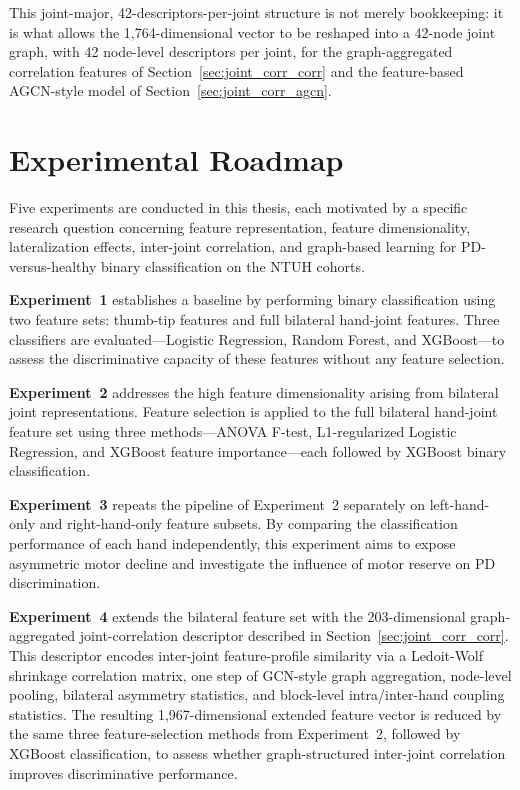 This joint-major, 42-descriptors-per-joint structure is not merely bookkeeping: it is what allows the 1,764-dimensional vector to be reshaped into a 42-node joint graph, with 42 node-level descriptors per joint, for the graph-aggregated correlation features of Section~\ref{sec:joint_corr_corr} and the feature-based AGCN-style model of Section~\ref{sec:joint_corr_agcn}.

\section{Experimental Roadmap}
\label{sec:roadmap}

Five experiments are conducted in this thesis, each motivated by a specific research question concerning feature representation, feature dimensionality, lateralization effects, inter-joint correlation, and graph-based learning for PD-versus-healthy binary classification on the NTUH cohorts.

\textbf{Experiment~1} establishes a baseline by performing binary classification using two feature sets: thumb-tip features and full bilateral hand-joint features. Three classifiers are evaluated---Logistic Regression, Random Forest, and XGBoost---to assess the discriminative capacity of these features without any feature selection.

\textbf{Experiment~2} addresses the high feature dimensionality arising from bilateral joint representations. Feature selection is applied to the full bilateral hand-joint feature set using three methods---ANOVA F-test, L1-regularized Logistic Regression, and XGBoost feature importance---each followed by XGBoost binary classification.

\textbf{Experiment~3} repeats the pipeline of Experiment~2 separately on left-hand-only and right-hand-only feature subsets. By comparing the classification performance of each hand independently, this experiment aims to expose asymmetric motor decline and investigate the influence of motor reserve on PD discrimination.

\textbf{Experiment~4} extends the bilateral feature set with the 203-dimensional graph-aggregated joint-correlation descriptor described in Section~\ref{sec:joint_corr_corr}. This descriptor encodes inter-joint feature-profile similarity via a Ledoit-Wolf shrinkage correlation matrix, one step of GCN-style graph aggregation, node-level pooling, bilateral asymmetry statistics, and block-level intra/inter-hand coupling statistics. The resulting 1,967-dimensional extended feature vector is reduced by the same three feature-selection methods from Experiment~2, followed by XGBoost classification, to assess whether graph-structured inter-joint correlation improves discriminative performance.

